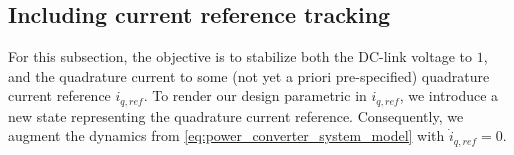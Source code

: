 \documentclass[lettersize,journal]{IEEEtran}
\begin{document}



\subsection{Including current reference tracking}

For this subsection, the objective is to stabilize both the DC-link voltage to $1$, and the quadrature current to some (not yet a priori pre-specified) quadrature current reference $i_{q,ref}$.
To render our design parametric in $i_{q,ref}$, we introduce a new state representing the quadrature current reference.
Consequently, we augment the dynamics from \cref{eq:power_converter_system_model} with $\dot i_{q,ref} = 0$.
\end{document}
